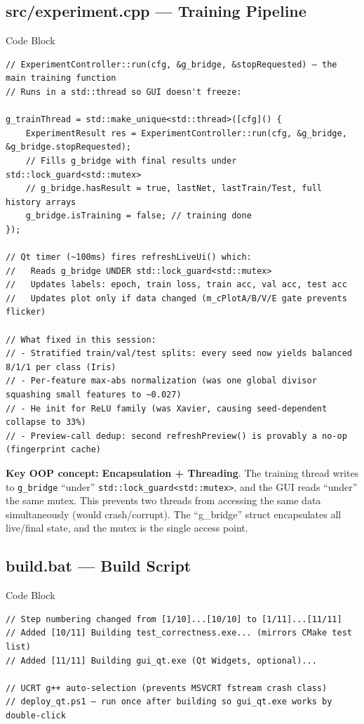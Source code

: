 \documentclass[12pt]{article}
\begin{document}
\subsection{src/experiment.cpp — Training Pipeline}
\begin{codebox}{Code Block}
\begin{lstlisting}
// ExperimentController::run(cfg, &g_bridge, &stopRequested) — the main training function
// Runs in a std::thread so GUI doesn't freeze:

g_trainThread = std::make_unique<std::thread>([cfg]() {
    ExperimentResult res = ExperimentController::run(cfg, &g_bridge, &g_bridge.stopRequested);
    // Fills g_bridge with final results under std::lock_guard<std::mutex>
    // g_bridge.hasResult = true, lastNet, lastTrain/Test, full history arrays
    g_bridge.isTraining = false; // training done
});

// Qt timer (~100ms) fires refreshLiveUi() which:
//   Reads g_bridge UNDER std::lock_guard<std::mutex>
//   Updates labels: epoch, train loss, train acc, val acc, test acc
//   Updates plot only if data changed (m_cPlotA/B/V/E gate prevents flicker)

// What fixed in this session:
// - Stratified train/val/test splits: every seed now yields balanced 8/1/1 per class (Iris)
// - Per-feature max-abs normalization (was one global divisor squashing small features to ~0.027)
// - He init for ReLU family (was Xavier, causing seed-dependent collapse to 33%)
// - Preview-call dedup: second refreshPreview() is provably a no-op (fingerprint cache)
\end{lstlisting}
\end{codebox}

\textbf{Key OOP concept:} \textbf{Encapsulation + Threading}. The training thread writes to \texttt{g\_bridge} ``under'' \texttt{std::lock\_guard<std::mutex>}, and the GUI reads ``under'' the same mutex. This prevents two threads from accessing the same data simultaneously (would crash/corrupt). The ``g\_bridge'' struct encapsulates all live/final state, and the mutex is the single access point.

\subsection{build.bat — Build Script}
\begin{codebox}{Code Block}
\begin{lstlisting}
// Step numbering changed from [1/10]...[10/10] to [1/11]...[11/11]
// Added [10/11] Building test_correctness.exe... (mirrors CMake test list)
// Added [11/11] Building gui_qt.exe (Qt Widgets, optional)...

// UCRT g++ auto-selection (prevents MSVCRT fstream crash class)
// deploy_qt.ps1 — run once after building so gui_qt.exe works by double-click
\end{lstlisting}
\end{codebox}
\end{document}
